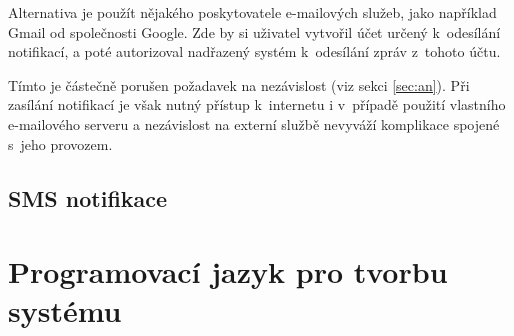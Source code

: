 Alternativa je použít nějakého poskytovatele e-mailových služeb, jako například Gmail od společnosti Google. Zde by si uživatel vytvořil účet určený k~odesílání notifikací, a poté autorizoval nadřazený systém k~odesílání zpráv z~tohoto účtu. 

Tímto je částečně porušen požadavek na nezávislost (viz sekci \ref{sec:an}). Při zasílání notifikací je však nutný přístup k~internetu i v~případě použití vlastního e-mailového serveru a nezávislost na externí službě nevyváží komplikace spojené s~jeho provozem.





\subsection{SMS notifikace}




\section{Programovací jazyk pro tvorbu systému}
\label{sec:an_lang}

